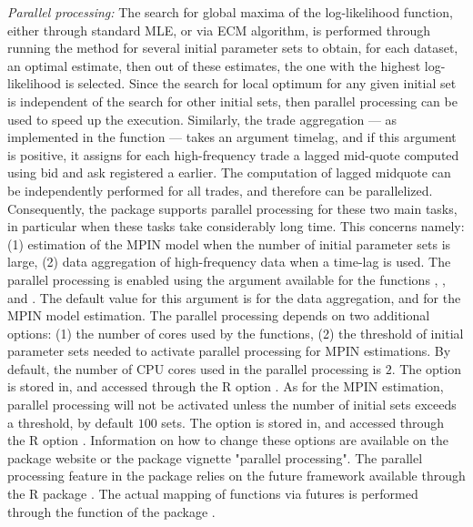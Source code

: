 \vspace{1mm}

\noindent \textit{Parallel processing:} The search for global maxima of the log-likelihood function, either through standard MLE, or via ECM algorithm, is performed through running the method for several initial parameter sets to obtain, for each dataset, an optimal estimate, then out of these estimates, the one with the highest log-likelihood is selected. Since the search for local optimum for any given initial set is independent of the search for other initial sets, then parallel processing can be used to speed up the execution. Similarly, the trade aggregation --- as implemented in the function  --- takes an argument timelag, and if this argument is positive, it assigns for each high-frequency trade a lagged mid-quote computed using bid  and ask registered a  earlier. The computation of lagged midquote can be independently performed for all trades, and therefore can be parallelized. Consequently, the package supports parallel processing for these two main tasks, in particular when these tasks take considerably long time. This concerns namely: (1) estimation of the MPIN model when the number of initial parameter sets is large, (2) data aggregation of high-frequency data when a time-lag is used. The parallel processing is enabled using the argument  available for the functions , , and . The default value for this argument is  for the data aggregation, and  for the MPIN model estimation. The parallel processing depends on two additional options: (1) the number of cores used by the functions, (2) the threshold of initial parameter sets needed to activate parallel processing for MPIN estimations. By default, the number of CPU cores used in the parallel processing is $2$. The option is stored in, and accessed through the R option . As for the MPIN estimation, parallel processing will not be activated unless the number of initial sets exceeds a threshold, by default $100$ sets. The option is stored in, and accessed through the R option .  Information on how to change these options are available on the package website or the package vignette "parallel processing". The parallel processing feature in the package relies on the future framework available through the R package  \citep{RJ-2021-048}. The actual mapping of functions via futures is performed through the function  of the package  \citep{furrr}.
\vspace{1mm}

